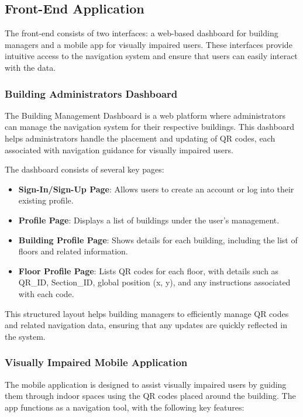 \subsection{Front-End Application}

The front-end consists of two interfaces: a web-based dashboard for building managers and a mobile app for visually impaired users. These interfaces provide intuitive access to the navigation system and ensure that users can easily interact with the data.

\subsubsection{Building Administrators Dashboard}

The Building Management Dashboard is a web platform where administrators can manage the navigation system for their respective buildings. This dashboard helps administrators handle the placement and updating of QR codes, each associated with navigation guidance for visually impaired users.

The dashboard consists of several key pages: \begin{itemize} \item \textbf{Sign-In/Sign-Up Page}: Allows users to create an account or log into their existing profile. \item \textbf{Profile Page}: Displays a list of buildings under the user's management. \item \textbf{Building Profile Page}: Shows details for each building, including the list of floors and related information. \item \textbf{Floor Profile Page}: Lists QR codes for each floor, with details such as QR\_ID, Section\_ID, global position (x, y), and any instructions associated with each code. \end{itemize}



This structured layout helps building managers to efficiently manage QR codes and related navigation data, ensuring that any updates are quickly reflected in the system.

\subsubsection{Visually Impaired Mobile Application}

The mobile application is designed to assist visually impaired users by guiding them through indoor spaces using the QR codes placed around the building. The app functions as a navigation tool, with the following key features:

